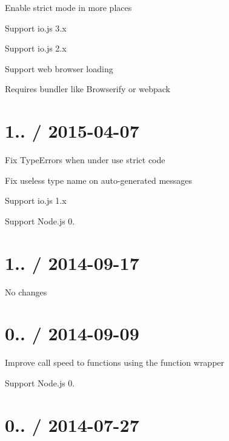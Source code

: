 
\begin{DoxyItemize}
\item Enable strict mode in more places
\item Support io.\+js 3.\+x
\item Support io.\+js 2.\+x
\item Support web browser loading
\begin{DoxyItemize}
\item Requires bundler like Browserify or webpack
\end{DoxyItemize}
\end{DoxyItemize}

\section*{1.. / 2015-\/04-\/07 }


\begin{DoxyItemize}
\item Fix {\ttfamily Type\+Error}s when under {\ttfamily \textquotesingle{}use strict\textquotesingle{}} code
\item Fix useless type name on auto-\/generated messages
\item Support io.\+js 1.\+x
\item Support Node.\+js 0.
\end{DoxyItemize}

\section*{1.. / 2014-\/09-\/17 }


\begin{DoxyItemize}
\item No changes
\end{DoxyItemize}

\section*{0.. / 2014-\/09-\/09 }


\begin{DoxyItemize}
\item Improve call speed to functions using the function wrapper
\item Support Node.\+js 0.
\end{DoxyItemize}

\section*{0.. / 2014-\/07-\/27 }


